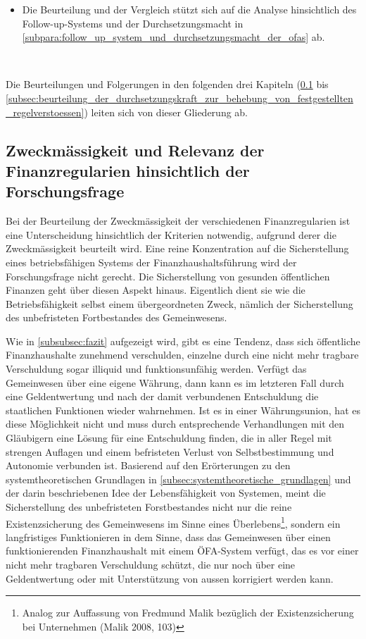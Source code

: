 \documentclass[10pt]{article}
\begin{document}
\begin{itemize}
    \item Die Beurteilung und der Vergleich stützt sich auf die Analyse hinsichtlich des Follow-up-Systems und der Durchsetzungsmacht in \vref{subpara:follow_up_system_und_durchsetzungsmacht_der_ofas} ab.

\end{itemize}

~

Die Beurteilungen und Folgerungen in den folgenden drei Kapiteln (\ref{subsec:zweckmaessigkeit_und_relevanz_der_finanzregularien_hinsichtlich_der_forschungsfrage} bis \ref{subsec:beurteilung_der_durchsetzungskraft_zur_behebung_von_festgestellten_regelverstoessen}) leiten sich von dieser Gliederung ab.

\subsection{Zweckmässigkeit und Relevanz der Finanzregularien hinsichtlich der Forschungsfrage}\label{subsec:zweckmaessigkeit_und_relevanz_der_finanzregularien_hinsichtlich_der_forschungsfrage}
Bei der Beurteilung der Zweckmässigkeit der verschiedenen Finanzregularien ist eine Unterscheidung hinsichtlich der Kriterien notwendig, aufgrund derer die Zweckmässigkeit beurteilt wird. Eine reine Konzentration auf die Sicherstellung eines betriebsfähigen Systems der Finanzhaushaltsführung wird der Forschungsfrage nicht gerecht. Die Sicherstellung von gesunden öffentlichen Finanzen geht über diesen Aspekt hinaus. Eigentlich dient sie wie die Betriebsfähigkeit selbst einem übergeordneten Zweck, nämlich der Sicherstellung des unbefristeten Fortbestandes des Gemeinwesens.

Wie in \vref{subsubsec:fazit} aufgezeigt wird, gibt es eine Tendenz, dass sich öffentliche Finanzhaushalte zunehmend verschulden, einzelne durch eine nicht mehr tragbare Verschuldung sogar illiquid und funktionsunfähig werden. Verfügt das Gemeinwesen über eine eigene Währung, dann kann es im letzteren Fall durch eine Geldentwertung und nach der damit verbundenen Entschuldung die staatlichen Funktionen wieder wahrnehmen. Ist es in einer Währungsunion, hat es diese Möglichkeit nicht und muss durch entsprechende Verhandlungen mit den Gläubigern eine Lösung für eine Entschuldung finden, die in aller Regel mit strengen Auflagen und einem befristeten Verlust von Selbstbestimmung und Autonomie verbunden ist. Basierend auf den Erörterungen zu den systemtheoretischen Grundlagen in \vref{subsec:systemtheoretische_grundlagen} und der darin beschriebenen Idee der Lebensfähigkeit von Systemen, meint die Sicherstellung des unbefristeten Forstbestandes nicht nur die reine Existenzsicherung des Gemeinwesens im Sinne eines Überlebens\footnote{Analog zur Auffassung von Fredmund Malik bezüglich der Existenzsicherung bei Unternehmen (Malik 2008, 103)}, sondern ein langfristiges Funktionieren in dem Sinne, dass das Gemeinwesen über einen funktionierenden Finanzhaushalt mit einem ÖFA-System verfügt, das es vor einer nicht mehr tragbaren Verschuldung schützt, die nur noch über eine Geldentwertung oder mit Unterstützung von aussen korrigiert werden kann.
\end{document}
